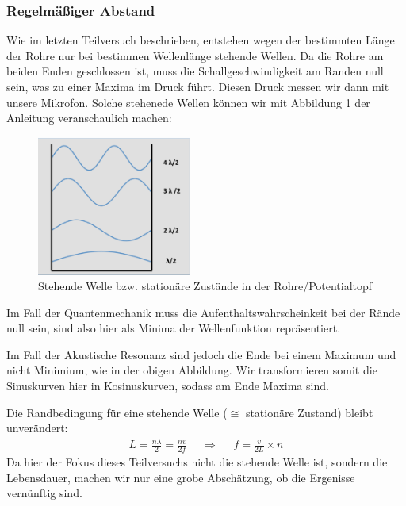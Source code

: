 		\subsubsection{Regelmäßiger Abstand}
			Wie im letzten Teilversuch beschrieben, entstehen wegen der bestimmten Länge der Rohre nur bei bestimmen Wellenlänge stehende Wellen. Da die Rohre am beiden Enden geschlossen ist, muss die Schallgeschwindigkeit am Randen null sein, was zu einer Maxima im Druck führt. Diesen Druck messen wir dann mit unsere Mikrofon. Solche stehenede Wellen können wir mit Abbildung 1 der Anleitung veranschaulich machen:
			\begin{figure}[!ht]
			    \centering
			    \includegraphics[width=0.45\textwidth]{./images/standing-waves.jpg}
			    \caption{Stehende Welle bzw. stationäre Zustände in der Rohre/Potentialtopf}
			    \label{fig:standing-waves}
			    \vspace{-1em}
			\end{figure}

			Im Fall der Quantenmechanik muss die Aufenthaltswahrscheinkeit bei der Rände null sein, sind also hier als Minima der Wellenfunktion repräsentiert. 

			Im Fall der Akustische Resonanz sind jedoch die Ende bei einem Maximum und nicht Minimium, wie in der obigen Abbildung. Wir transformieren somit die Sinuskurven hier in Kosinuskurven, sodass am Ende Maxima sind.

			Die Randbedingung für eine stehende Welle ($\cong$ stationäre Zustand) bleibt unverändert:  
			\begin{align}
				L = \frac{n\lambda}{2} = \frac{nv}{2f} &&\Rightarrow&& f = \frac{v}{2L} \times n
			\end{align}
			Da hier der Fokus dieses Teilversuchs nicht die stehende Welle ist, sondern die Lebensdauer, machen wir nur eine grobe Abschätzung, ob die Ergenisse vernünftig sind. 

